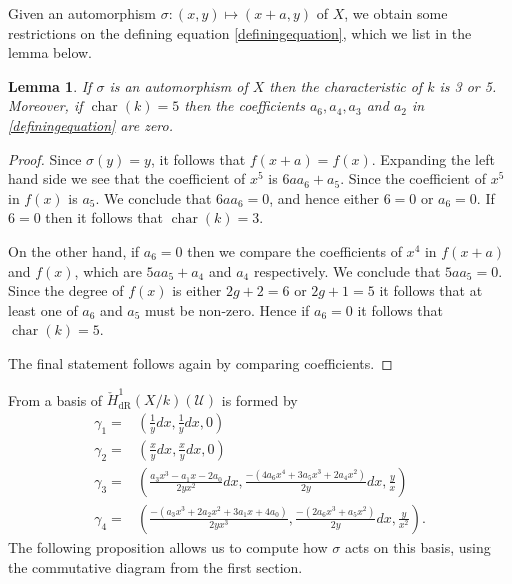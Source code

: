 \documentclass[draft, 11pt]{article} %
\theoremstyle{plain}
\newtheorem{lem}[defn]{Lemma}
\theoremstyle{remark}
\newcommand{\cU}{{\mathcal U}}
\newcommand{\cechderhamhone}{\check{H}_{\text {dR}}^1(X/k)}
\DeclareMathOperator{\cha}{char}
\begin{document}
Given an automorphism $\sigma\colon (x,y) \mapsto (x+a,y)$ of $X$, we obtain some restrictions on the defining equation \eqref{definingequation}, which we list in the lemma below.

\begin{lem}
If $\sigma$ is an automorphism of $X$ then the characteristic of $k$ is 3 or 5. 
Moreover, if $\cha(k)=5$ then the coefficients $a_6, a_4, a_3$ and $a_2$ in \eqref{definingequation} are zero.
\end{lem}
\begin{proof}
Since $\sigma(y) = y$, it follows that $f(x+a) = f(x)$.
Expanding the left hand side we see that the coefficient of $x^5$ is $6aa_6 + a_5$.
Since the coefficient of $x^5$ in $f(x)$ is $a_5$.
We conclude that $6aa_6 = 0$, and hence either $6=0$ or $a_6=0$.
If $6=0$ then it follows that $\cha (k)=3$.

On the other hand, if $a_6=0$ then we compare the coefficients of $x^4$ in $f(x+a)$ and $f(x)$, which are $5aa_5+a_4$ and $a_4$ respectively.
We conclude that $5aa_5=0$. Since the degree of $f(x)$ is either $2g+2=6$ or $2g+1=5$ it follows that at least one of $a_6$ and $a_5$ must be non-zero.
Hence if $a_6=0$ it follows that $\cha(k) = 5$.

The final statement follows again by comparing coefficients.
\end{proof}

From \cite{derhamactions} a basis of $\cechderhamhone(\cU)$ is formed by
\begin{align*}
\gamma_1  = & \left( \frac{1}{y}dx, \frac{1}{y}dx, 0\right) \\
\gamma_2 = & \left(\frac{x}{y}dx, \frac{x}{y}dx, 0\right) \\
\gamma_3 = & \left( \frac{a_3x^3-a_1x-2a_0}{2yx^2}dx, \frac{-(4a_6x^4+3a_5x^3+2a_4x^2)}{2y}dx, \frac{y}{x} \right)\\
\gamma_4 = & \left(\frac{-(a_3x^3+2a_2x^2+3a_1x+4a_0)}{2yx^3},\frac{-(2a_6x^3+a_5x^2)}{2y}dx , \frac{y}{x^2} \right).
\end{align*}
The following proposition allows us to compute how $\sigma$ acts on this basis, using the commutative diagram from the first section.
\end{document}
